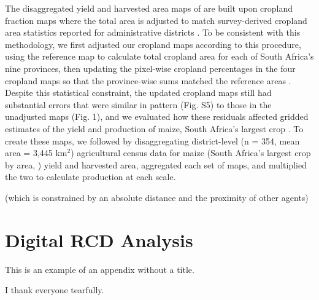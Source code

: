\documentclass{pnastwo}
\begin{document}
\begin{article}
\begin{materials}
The disaggregated yield and harvested area maps of \cite{monfreda_farming_2008} are built upon cropland fraction maps where the total area is adjusted to match survey-derived cropland area statistics reported for administrative districts \cite[provinces, in South Africa's case][]{ramankutty_farming_2008}. To be consistent with this methodology, we first adjusted our cropland maps according to this procedure, using the reference map to calculate total cropland area for each of South Africa's nine provinces, then updating the pixel-wise cropland percentages in the four cropland maps so that the province-wise sums matched the reference areas \cite[][and see SI]{ramankutty_farming_2008}. Despite this statistical constraint, the updated cropland maps still had substantial errors that were similar in pattern (Fig. S5) to those in the unadjusted maps (Fig. 1), and we evaluated how these residuals affected gridded estimates of the yield and production of maize, South Africa's largest crop \cite{estes_comparing_2013}. To create these maps, we followed \cite{monfreda_farming_2008} by disaggregating district-level (n = 354, mean area = 3,445 km$^2$) agricultural census data \cite{statistics_south_africa_commercial_2007} for maize (South Africa's largest crop by area, \cite{estes_comparing_2013}) yield and harvested area, aggregated each set of maps, and multiplied the two to calculate production at each scale. 

(which is constrained by an absolute distance and the proximity of other agents) 

\section{Digital RCD Analysis} 
\end{materials}

\appendix[App 1]

\appendix
This is an example of an appendix without a title.

\begin{acknowledgments}
I thank everyone tearfully. 
\end{acknowledgments}


 
{\footnotesize }

%


\end{article}
\end{document}
